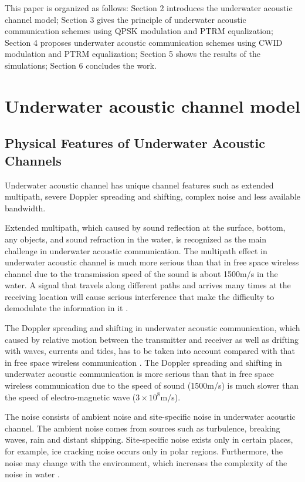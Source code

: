 \documentclass[journal]{IEEEtran}
\begin{document}
This paper is organized as follows: Section 2 introduces the
underwater acoustic channel model; Section 3 gives the principle of
underwater acoustic communication schemes using QPSK modulation and
PTRM equalization; Section 4 proposes underwater acoustic
communication schemes using CWID modulation and PTRM equalization;
Section 5 shows the results of the simulations; Section 6 concludes
the work.
\section{Underwater acoustic channel model}
\subsection{Physical Features of Underwater Acoustic Channels}
Underwater acoustic channel has unique channel features such as
extended multipath, severe Doppler spreading and shifting, complex
noise and less available bandwidth.

Extended multipath, which caused by sound reflection at the surface,
bottom, any objects, and sound refraction in the water, is
recognized as the main challenge in underwater acoustic
communication. The multipath effect in underwater acoustic channel
is much more serious than that in free space wireless channel due to
the transmission speed of the sound is about 1500m/s in the water. A
signal that travels along different paths and arrives many times at
the receiving location will cause serious interference that make the
difficulty to demodulate the information in it
\cite{Du2011,Stojanovic2009}.

The Doppler spreading and shifting in underwater acoustic
communication, which caused by relative motion between the
transmitter and receiver as well as drifting with waves, currents
and tides, has to be taken into account compared with that in free
space wireless communication \cite{Stojanovic2009}. The Doppler
spreading and shifting in underwater acoustic communication is more
serious than that in free space wireless communication due to the
speed of sound (1500m/s) is much slower than the speed of
electro-magnetic wave ($3\times{10^8}$m/s).

The noise consists of ambient noise and site-specific noise in
underwater acoustic channel. The ambient noise comes from sources
such as turbulence, breaking waves, rain and distant shipping.
Site-specific noise exists only in certain places, for example, ice
cracking noise occurs only in polar regions. Furthermore, the noise
may change with the environment, which increases the complexity of
the noise in water \cite{Stojanovic2009}.
\end{document}

